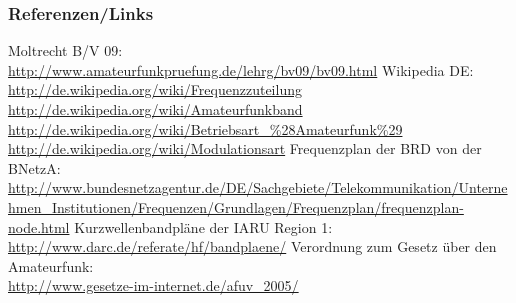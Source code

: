 \renewcommand{\refname}{Referenzen}

\begin{frame}
    \frametitle{Referenzen/Links}
    \hypertarget{refs}{}
    \footnotesize

    \begin{thebibliography}{}
         Moltrecht B/V 09: \\
                        \url{http://www.amateurfunkpruefung.de/lehrg/bv09/bv09.html}
            Wikipedia DE: \\
                        \url{http://de.wikipedia.org/wiki/Frequenzzuteilung} \\
                        \url{http://de.wikipedia.org/wiki/Amateurfunkband} \\
                        \url{http://de.wikipedia.org/wiki/Betriebsart_\%28Amateurfunk\%29} \\
                        \url{http://de.wikipedia.org/wiki/Modulationsart}
          Frequenzplan der BRD von der BNetzA: \\
                        \url{http://www.bundesnetzagentur.de/DE/Sachgebiete/Telekommunikation/Unternehmen_Institutionen/Frequenzen/Grundlagen/Frequenzplan/frequenzplan-node.html}
          Kurzwellenbandpläne der IARU Region 1: \\
                        \url{http://www.darc.de/referate/hf/bandplaene/}
          Verordnung zum Gesetz über den Amateurfunk: \\
                        \url{http://www.gesetze-im-internet.de/afuv_2005/}
    \end{thebibliography} 
   
\end{frame}



